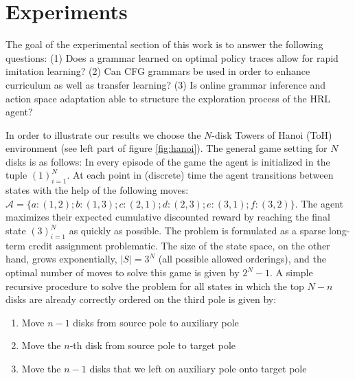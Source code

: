 \documentclass[colorinlistoftodos]{article}
\theoremstyle{definition}
\begin{document}
\newpage
\section{Experiments}

The goal of the experimental section of this work is to answer the following questions: (1) Does a grammar learned on optimal policy traces allow for rapid imitation learning? (2) Can CFG grammars be used in order to enhance curriculum as well as transfer learning? (3) Is online grammar inference and action space adaptation able to structure the exploration process of the HRL agent?

In order to illustrate our results we choose the $N$-disk Towers of Hanoi (ToH) environment (see left part of figure \ref{fig:hanoi}). The general game setting for $N$ disks is as follows: In every episode of the game the agent is initialized in the tuple $(1)_{i=1}^N$. At each point in (discrete) time the agent transitions between states with the help of the following moves:  $\mathcal{A} = \{a:(1,2); b:(1,3); c:(2,1); d:(2,3); e:(3,1); f:(3,2)\}$. The agent maximizes their expected cumulative discounted reward by reaching the final state $(3)_{i=1}^N$ as quickly as possible. The problem is formulated as a sparse long-term credit assignment problematic. The size of the state space, on the other hand, grows exponentially, $|S| = 3^N$ (all possible allowed orderings), and the optimal number of moves to solve this game is given by $2^N - 1$. A simple recursive procedure to solve the problem for all states in which the top $N-n$ disks are already correctly ordered on the third pole is given by:

\begin{enumerate}
	\item Move $n-1$ disks from source pole to auxiliary pole
	\item Move the $n$-th disk from source pole to target pole
	\item Move the $n-1$ disks that we left on auxiliary pole onto target pole
\end{enumerate}
\end{document}
